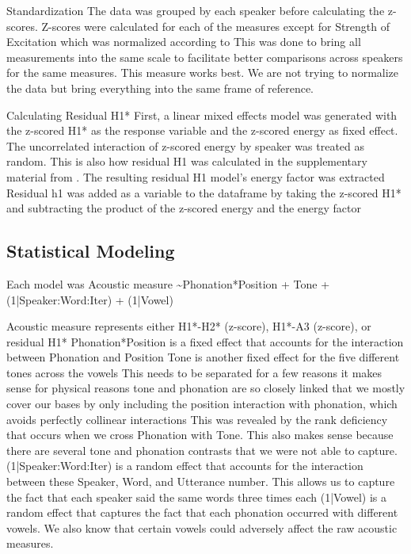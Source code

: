 \documentclass[12pt, letterpaper]{article}
\begin{document}
Standardization
The data was grouped by each speaker before calculating the z-scores.
Z-scores were calculated for each of the measures except for Strength of Excitation which was normalized according to \citet{garellekVoicingGlottalConsonants2021}
This was done to bring all measurements into the same scale to facilitate better comparisons across speakers for the same measures.
This measure works best. We are not trying to normalize the data but bring everything into the same frame of reference.

Calculating Residual H1*
First, a linear mixed effects model was generated with the z-scored H1* as the response variable and the z-scored energy as fixed effect. 
The uncorrelated interaction of z-scored energy by speaker was treated as random. 
This is also how residual H1 was calculated in the supplementary material from \citet{chaiH1H2Acoustic2022}.
The resulting residual H1 model’s energy factor was extracted
Residual h1 was added as a variable to the dataframe by taking the z-scored H1* and subtracting the product of the z-scored energy and the energy factor 

\subsection{Statistical Modeling} \label{sec:Statistics}

Each model was Acoustic measure \sim  Phonation*Position + Tone + (1|Speaker:Word:Iter) + (1|Vowel)

Acoustic measure represents either H1*-H2* (z-score), H1*-A3 (z-score), or residual H1* 
Phonation*Position is a fixed effect that accounts for the interaction between Phonation and Position
Tone is another fixed effect for the five different tones across the vowels
This needs to be separated for a few reasons
it makes sense for physical reasons
tone and phonation are so closely linked that we mostly cover our bases by only including the position interaction with phonation, which avoids perfectly collinear interactions
This was revealed by the rank deficiency that occurs when we cross Phonation with Tone. 
This also makes sense because there are several tone and phonation contrasts that we were not able to capture.
(1|Speaker:Word:Iter) is a random effect that accounts for the interaction between these Speaker, Word, and Utterance number.
This allows us to capture the fact that each speaker said the same words three times each 
(1|Vowel) is a random effect that captures the fact that each phonation occurred with different vowels. 
We also know that certain vowels could adversely affect the raw acoustic measures.
\end{document}
